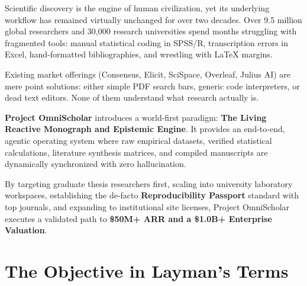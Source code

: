 \documentclass[11pt,a4paper]{article}
\begin{document}
\begin{execsummary}
Scientific discovery is the engine of human civilization, yet its underlying workflow has remained virtually unchanged for over two decades. Over 9.5 million global researchers and 30,000 research universities spend months struggling with fragmented tools: manual statistical coding in SPSS/R, transcription errors in Excel, hand-formatted bibliographies, and wrestling with LaTeX margins.

Existing market offerings (Consensus, Elicit, SciSpace, Overleaf, Julius AI) are mere point solutions: either simple PDF search bars, generic code interpreters, or dead text editors. None of them understand what research actually is.

\textbf{Project OmniScholar} introduces a world-first paradigm: \textbf{The Living Reactive Monograph and Epistemic Engine}. It provides an end-to-end, agentic operating system where raw empirical datasets, verified statistical calculations, literature synthesis matrices, and compiled manuscripts are dynamically synchronized with zero hallucination.

By targeting graduate thesis researchers first, scaling into university laboratory workspaces, establishing the de-facto \textbf{Reproducibility Passport} standard with top journals, and expanding to institutional site licenses, Project OmniScholar executes a validated path to \textbf{\$50M+ ARR and a \$1.0B+ Enterprise Valuation}.
\end{execsummary}

\vspace{1em}

\section{The Objective in Layman's Terms}
\end{document}
